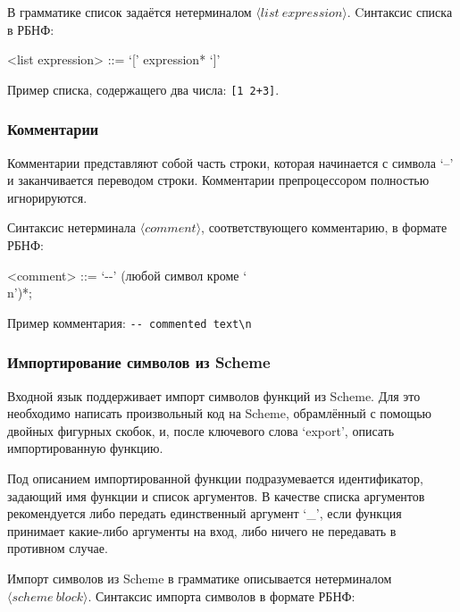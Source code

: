 \documentclass[12pt,a4paper,oneside]{extarticle}
\begin{document}
            В грамматике список задаётся нетерминалом $\langle list~expression \rangle$. Cинтаксис списка в РБНФ:
            \begin{grammar}
                <list expression> ::= `[' expression* `]'
            \end{grammar}

            Пример списка, содержащего два числа: \lstinline$[1 2+3]$.

        \subsubsection{Комментарии}
            Комментарии представляют собой часть строки, которая начинается с символа `--' и заканчивается переводом строки.
            Комментарии препроцессором полностью игнорируются.

            Синтаксис нетерминала $\langle comment \rangle$, соответствующего комментарию, в формате РБНФ:

            \begin{grammar}
                <comment> ::= `-\null-' (любой символ кроме `\\n')*;
            \end{grammar}

            Пример комментария: \lstinline$-- commented text\n$
            

        \subsubsection{Импортирование символов из Scheme}
            Входной язык поддерживает импорт символов функций из Scheme.
            Для это необходимо написать произвольный код на Scheme, обрамлённый с помощью двойных фигурных скобок, и, после ключевого слова `export', описать импортированную функцию.

            Под описанием импортированной функции подразумевается идентификатор, задающий имя функции и список аргументов.
            В качестве списка аргументов рекомендуется либо передать единственный аргумент `\_', если функция принимает какие-либо аргументы на вход, либо ничего не передавать в противном случае.

            Импорт символов из Scheme в грамматике описывается нетерминалом $\langle scheme~block \rangle$. Синтаксис импорта символов в формате РБНФ:            
            \begin{grammar}
                <scheme block> ::= <SCHEME BODY> `export' <IDENTIFIER> <function arguments> 

                <SCHEME BODY> ::= `{{' (любой символ кроме `}')* `}}'
            \end{grammar}
\end{document}
